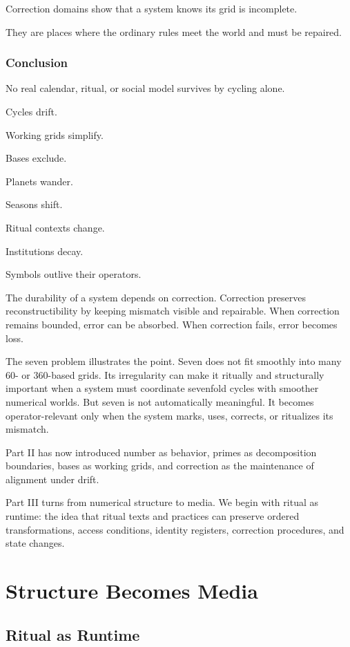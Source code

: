 \documentclass[11pt]{book}
\begin{document}
Correction domains show that a system knows its grid is incomplete.

They are places where the ordinary rules meet the world and must be repaired.

\section{Conclusion}

No real calendar, ritual, or social model survives by cycling alone.

Cycles drift.

Working grids simplify.

Bases exclude.

Planets wander.

Seasons shift.

Ritual contexts change.

Institutions decay.

Symbols outlive their operators.

The durability of a system depends on correction. Correction preserves reconstructibility by keeping mismatch visible and repairable. When correction remains bounded, error can be absorbed. When correction fails, error becomes loss.

The seven problem illustrates the point. Seven does not fit smoothly into many \(60\)- or \(360\)-based grids. Its irregularity can make it ritually and structurally important when a system must coordinate sevenfold cycles with smoother numerical worlds. But seven is not automatically meaningful. It becomes operator-relevant only when the system marks, uses, corrects, or ritualizes its mismatch.

Part II has now introduced number as behavior, primes as decomposition boundaries, bases as working grids, and correction as the maintenance of alignment under drift.

Part III turns from numerical structure to media. We begin with ritual as runtime: the idea that ritual texts and practices can preserve ordered transformations, access conditions, identity registers, correction procedures, and state changes.

\part{Structure Becomes Media}

\chapter{Ritual as Runtime}
\end{document}
